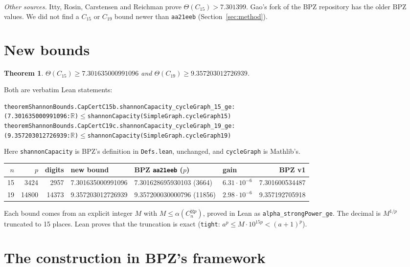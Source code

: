 \documentclass[11pt]{amsart}
\newtheorem{theorem}{Theorem}
\newcommand{\T}{\Theta}
\newcommand{\sbx}{\boxtimes}
\newcommand{\code}[1]{\texttt{#1}}
\begin{document}
\emph{Other sources.} Itty, Rosin, Carstensen and Reichman \cite{IRCR} prove
$\T(C_{15})>7.301399$. Gao's fork of the BPZ repository has the older BPZ values. We did not
find a $C_{15}$ or $C_{19}$ bound newer than \code{aa21eeb} (Section~\ref{sec:method}).

\section{New bounds}

\begin{theorem}
$\T(C_{15})\ge 7.301635000991096$ and $\T(C_{19})\ge 9.357203012726939$.
\end{theorem}

Both are verbatim Lean statements:
\begin{alltt}\small
theorem ShannonBounds.CapCertC15b.shannonCapacity_cycleGraph_15_ge :
    (7.301635000991096 : \(\mathbb{R}\)) \(\le\) shannonCapacity (SimpleGraph.cycleGraph 15)
theorem ShannonBounds.CapCertC19c.shannonCapacity_cycleGraph_19_ge :
    (9.357203012726939 : \(\mathbb{R}\)) \(\le\) shannonCapacity (SimpleGraph.cycleGraph 19)
\end{alltt}
Here \code{shannonCapacity} is BPZ's definition in \code{Defs.lean}, unchanged, and
\code{cycleGraph} is Mathlib's.

\begin{center}\footnotesize
\setlength{\tabcolsep}{3pt}
\begin{tabular}{rrrlllr}
\toprule
$n$ & $p$ & digits & new bound & BPZ \code{aa21eeb} ($p$) & gain & BPZ v1\\
\midrule
15 & 3424 & 2957 & 7.301635000991096 & 7.301628695930103 (3664) & $6.31\cdot10^{-6}$ & 7.301600534487\\
19 & 14800 & 14373 & 9.357203012726939 & 9.357200030000796 (11856) & $2.98\cdot10^{-6}$ & 9.357192705918\\
\bottomrule
\end{tabular}
\end{center}

Each bound comes from an explicit integer $M$ with $M\le\alpha(C_n^{\sbx p})$, proved in Lean as
\code{alpha\_strongPower\_ge}. The decimal is $M^{1/p}$ truncated to 15 places. Lean proves that
the truncation is exact (\code{tight}: $a^p\le M\cdot10^{15p}<(a+1)^p$).

\section{The construction in BPZ's framework}
\end{document}
